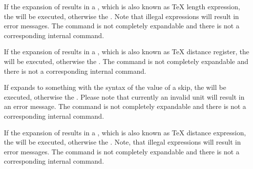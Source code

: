 \begin{Declaration}
\end{Declaration}
%
If the expansion of results in
a , which is also known as \TeX{} length expression, the
 will be executed, otherwise the . Note that illegal expressions will
result in error messages. The command is not completely expandable and there
is not a corresponding internal command.%
%

\begin{Declaration}
\end{Declaration}
%
If the expansion of results in
a , which is also known as \TeX{} distance register, the
 will be executed, otherwise the . The command is not completely expandable and there is not a
corresponding internal command.%
%

\begin{Declaration}
\end{Declaration}
%
If  expands to something with
the syntax of the value of a skip, the  will be
executed, otherwise the . Please
note that currently an invalid unit will result in an
error message. The command is not completely expandable and there is not a
corresponding internal command.%
%

\begin{Declaration}
\end{Declaration}
%
If the expansion of results in
a , which is also known as \TeX{} distance expression, the
 will be executed, otherwise the . Note, that illegal expressions will
result in error messages. The command is not completely expandable and there
is not a corresponding internal command.%
%

